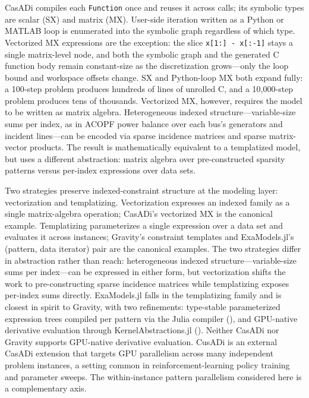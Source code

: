 \documentclass[11pt]{article}
\begin{document}
CasADi compiles each \texttt{Function} once and reuses it across calls; its symbolic types are scalar (SX) and matrix (MX). User-side iteration written as a Python or MATLAB loop is enumerated into the symbolic graph regardless of which type. Vectorized MX expressions are the exception: the slice \texttt{x[1:] - x[:-1]} stays a single matrix-level node, and both the symbolic graph and the generated C function body remain constant-size as the discretization grows---only the loop bound and workspace offsets change. SX and Python-loop MX both expand fully: a 100-step problem produces hundreds of lines of unrolled C, and a 10{,}000-step problem produces tens of thousands. Vectorized MX, however, requires the model to be written as matrix algebra. Heterogeneous indexed structure---variable-size sums per index, as in ACOPF power balance over each bus's generators and incident lines---can be encoded via sparse incidence matrices and sparse matrix-vector products. The result is mathematically equivalent to a templatized model, but uses a different abstraction: matrix algebra over pre-constructed sparsity patterns versus per-index expressions over data sets. 

Two strategies preserve indexed-constraint structure at the modeling layer: vectorization and templatizing. Vectorization expresses an indexed family as a single matrix-algebra operation; CasADi's vectorized MX is the canonical example. Templatizing parameterizes a single expression over a data set and evaluates it across instances; Gravity's constraint templates and ExaModels.jl's (pattern, data iterator) pair are the canonical examples. The two strategies differ in abstraction rather than reach: heterogeneous indexed structure---variable-size sums per index---can be expressed in either form, but vectorization shifts the work to pre-constructing sparse incidence matrices while templatizing exposes per-index sums directly. ExaModels.jl falls in the templatizing family and is closest in spirit to Gravity, with two refinements: type-stable parameterized expression trees compiled per pattern via the Julia compiler (), and GPU-native derivative evaluation through KernelAbstractions.jl (). Neither CasADi nor Gravity supports GPU-native derivative evaluation. CusADi \citep{jeonCusADiGPUParallelization2025} is an external CasADi extension that targets GPU parallelism across many independent problem instances, a setting common in reinforcement-learning policy training and parameter sweeps. The within-instance pattern parallelism considered here is a complementary axis.
\end{document}
